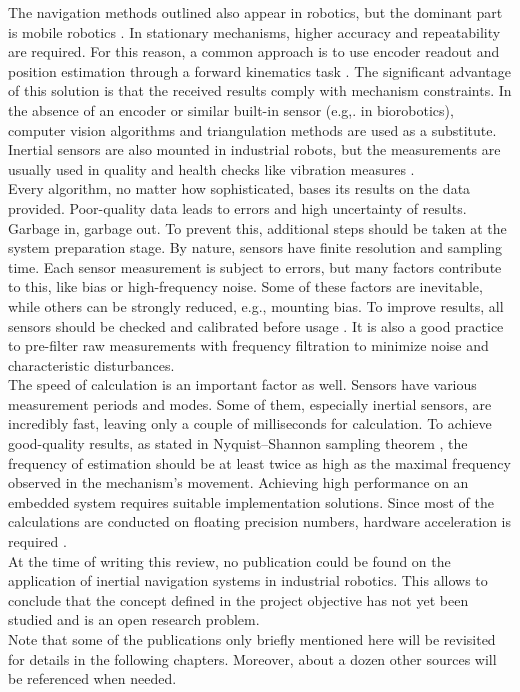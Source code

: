 The navigation methods outlined also appear in robotics, but the dominant part is mobile robotics \cite{accelerometer_mobile}. In stationary mechanisms, higher accuracy and repeatability are required. For this reason, a common approach is to use encoder readout and position estimation through a forward kinematics task \cite{forward_kinematics}. The significant advantage of this solution is that the received results comply with mechanism constraints. In the absence of an encoder or similar built-in sensor (e.g,. in biorobotics), computer vision algorithms \cite{cv_positioning} \cite{cv_positioning2} and triangulation methods \cite{igps} are used as a substitute. Inertial sensors are also mounted in industrial robots, but the measurements are usually used in quality and health checks like vibration measures \cite{Dogrusoz_2020}.\\

Every algorithm, no matter how sophisticated, bases its results on the data provided. Poor-quality data leads to errors and high uncertainty of results. Garbage in, garbage out. To prevent this, additional steps should be taken at the system preparation stage. By nature, sensors have finite resolution and sampling time. Each sensor measurement is subject to errors, but many factors contribute to this, like bias or high-frequency noise. Some of these factors are inevitable, while others can be strongly reduced, e.g., mounting bias. To improve results, all sensors should be checked and calibrated before usage \cite{mi13060879} \cite{Hol_2011} \cite{gyro_calib}. It is also a good practice to pre-filter raw measurements with frequency filtration \cite{BADRI20101425} to minimize noise and characteristic disturbances. \\

The speed of calculation is an important factor as well. Sensors have various measurement periods and modes. Some of them, especially inertial sensors, are incredibly fast, leaving only a couple of milliseconds for calculation. To achieve good-quality results, as stated in Nyquist–Shannon sampling theorem \cite{sample_theorem}, the frequency of estimation should be at least twice as high as the maximal frequency observed in the mechanism's movement. Achieving high performance on an embedded system requires suitable implementation solutions. Since most of the calculations are conducted on floating precision numbers, hardware acceleration is required  \cite{fpu2} \cite{fpu}.\\

At the time of writing this review, no publication could be found on the application of inertial navigation systems in industrial robotics. This allows to conclude that the concept defined in the project objective has not yet been studied and is an open research problem.\\

Note that some of the publications only briefly mentioned here will be revisited for details in the following chapters. Moreover, about a dozen other sources will be referenced when needed.




